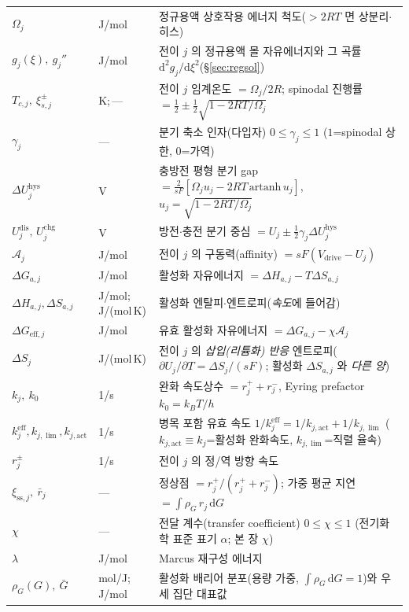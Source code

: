 \documentclass[11pt,a4paper]{article}
\newcommand{\dd}{\mathrm{d}}
\newcommand{\eff}{\mathrm{eff}}
\newcommand{\drive}{\mathrm{drive}}
\newcommand{\sstat}{\mathrm{ss}}
\newcommand{\dis}{\mathrm{dis}}
\newcommand{\chg}{\mathrm{chg}}
\newcommand{\hys}{\mathrm{hys}}
\begin{document}
\begin{longtable}{p{} p{} p{}}
$\Omega_j$ & J/mol & 정규용액 상호작용 에너지 척도($>2RT$ 면 상분리$\cdot$히스) \\
$g_j(\xi),\ g_j''$ & J/mol & 전이 $j$ 의 정규용액 몰 자유에너지와 그 곡률 $\dd^2g_j/\dd\xi^2$(\S\ref{sec:regsol}) \\
$T_{c,j},\ \xi_{s,j}^\pm$ & K;\,--- & 전이 $j$ 임계온도 $=\Omega_j/2R$; spinodal 진행률 $=\tfrac12\pm\tfrac12\sqrt{1-2RT/\Omega_j}$ \\
$\gamma_j$ & --- & 분기 축소 인자(다입자) $0\le\gamma_j\le1$ ($1$=spinodal 상한, $0$=가역) \\
$\Delta U_j^\hys$ & V & 충방전 평형 분기 gap $=\tfrac{2}{sF}[\Omega_j u_j-2RT\,\mathrm{artanh}\,u_j]$, $u_j=\sqrt{1-2RT/\Omega_j}$ \\
$U_j^{\dis},\,U_j^{\chg}$ & V & 방전$\cdot$충전 분기 중심 $=U_j\pm\tfrac12\gamma_j\Delta U_j^\hys$ \\
$\mathcal A_j$ & J/mol & 전이 $j$ 의 구동력(affinity) $=sF(V_\drive-U_j)$ \\
$\Delta G_{a,j}$ & J/mol & 활성화 자유에너지 $=\Delta H_{a,j}-T\Delta S_{a,j}$ \\
$\Delta H_{a,j},\Delta S_{a,j}$ & {\footnotesize J/mol;\,J/(mol\,K)} & 활성화 엔탈피$\cdot$엔트로피(\emph{속도}에 들어감) \\
$\Delta G_{\eff,j}$ & J/mol & 유효 활성화 자유에너지 $=\Delta G_{a,j}-\chi\mathcal A_j$ \\
$\Delta S_j$ & J/(mol\,K) & 전이 $j$ 의 \emph{삽입(리튬화) 반응} 엔트로피($\partial U_j/\partial T=\Delta S_j/(sF)$; 활성화 $\Delta S_{a,j}$ 와 \emph{다른 양}) \\
$k_j,\ k_0$ & 1/s & 완화 속도상수 $=r_j^++r_j^-$, Eyring prefactor $k_0=k_BT/h$ \\
$k_j^{\eff},k_{j,\lim},k_{j,\mathrm{act}}$ & 1/s & 병목 포함 유효 속도 $1/k_j^{\eff}=1/k_{j,\mathrm{act}}+1/k_{j,\lim}$ ($k_{j,\mathrm{act}}\!\equiv\!k_j$=활성화 완화속도, $k_{j,\lim}$=직렬 율속) \\
$r_j^\pm$ & 1/s & 전이 $j$ 의 정/역 방향 속도 \\
$\xi_{\sstat,j},\ \bar r_j$ & --- & 정상점 $=r_j^+/(r_j^++r_j^-)$; 가중 평균 지연 $=\int\rho_G\,r_j\,\dd G$ \\
$\chi$ & --- & 전달 계수(transfer coefficient) $0\le\chi\le1$ (전기화학 표준 표기 $\alpha$; 본 장 $\chi$) \\
$\lambda$ & J/mol & Marcus 재구성 에너지 \\
$\rho_G(G),\ \bar G$ & mol/J;\,J/mol & 활성화 배리어 분포(용량 가중, $\int\rho_G\,\dd G=1$)와 우세 집단 대표값 \\

\end{longtable}
\end{document}
